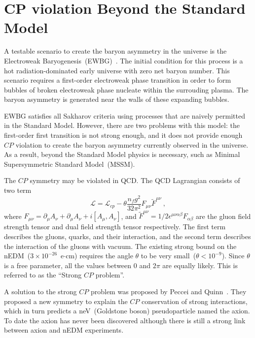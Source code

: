 \section{CP violation Beyond the Standard Model}
A testable scenario to create the baryon asymmetry in the universe is
the Electroweak Baryogenesis~(EWBG)~\cite{Morrissey2012}. The initial
condition for this process is a hot radiation-dominated early universe
with zero net baryon number. This scenario requires a first-order
electroweak phase transition in order to form bubbles of broken
electroweak phase nucleate within the surrouding plasma. The baryon
asymmetry is generated near the walls of these expanding bubbles.

EWBG satisfies all Sakharov criteria using processes that are naively
permitted in the Standard Model. However, there are two problems with
this model: the first-order first transition is not strong enough, and
it does not provide enough $CP$ violation to create the baryon
asymmetry currently observed in the universe. As a result, beyond the
Standard Model physics is necessary, such as Minimal Supersymmetric
Standard Model~(MSSM).

The $CP$ symmetry may be violated in QCD. The QCD Lagrangian consists
of two term
\begin{equation}
  \label{eqn:qcd}
\mathscr{L}= \mathscr{L}_{cp} - \theta \frac{n_f g^2}{32 \pi^2} F_{\mu \nu} \tilde{F}^{\mu \nu}~,
\end{equation}
where
$F_{\mu \nu} = \partial_\mu A_\nu + \partial_\mu A_\nu +
i[A_\mu,A_\nu]$, and
$\tilde{F}^{\mu \nu}=1/2 \epsilon^{\mu \nu \alpha \beta}F_{\alpha
  \beta}$ are the gluon field strength tensor and dual field strength
tensor respectively. The first term describes the gluons, quarks, and
their interaction, and the second term describes the interaction of
the gluons with vacuum. The existing strong bound on the
nEDM~($3 \times 10^{-26}$~e$\cdot$cm) requires the angle $\theta$ to
be very small~($\theta < 10^{-9}$). Since $\theta$ is a free
parameter, all the values between 0 and $2\pi$ are equally
likely. This is referred to as the ``Strong $CP$ problem''.

A solution to the strong $CP$ problem was proposed by Peccei and
Quinn~\cite{Peccei1977}. They proposed a new symmetry to explain the
$CP$ conservation of strong interactions, which in turn predicts a
neV~(Goldstone boson) pseudoparticle named the axion. To date the
axion has never been discovered although there is still a strong link
between axion and nEDM experiments.

